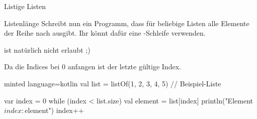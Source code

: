 \begin{task}[points=auto]{Listige Listen}
\begin{subtask*}[points=0]{Listenlänge }
        Schreibt nun ein Programm, dass für beliebige Listen alle Elemente der Reihe
        nach ausgibt. Ihr könnt dafür eine -Schleife verwenden.

        \begin{anmerkung}
             ist natürlich nicht erlaubt ;)
        \end{anmerkung}
        \begin{solution}
            Da die Indices bei 0 anfangen ist  der letzte gültige Index.

            \begin{codeBlock}[]{minted language=kotlin}
                val list = listOf(1, 2, 3, 4, 5) // Beispiel-Liste

                var index = 0
                while (index < list.size) {
                    val element = list[index]
                    println("Element $index: $element")
                    index++
                }
            \end{codeBlock}
        \end{solution}
    \end{subtask*}
\end{task}
